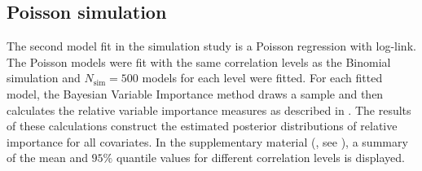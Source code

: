 \subsection{Poisson simulation}
The second model fit in the simulation study is a Poisson regression with log-link. The Poisson models were fit with the same correlation levels as the Binomial simulation and $N_{\text{sim}}=500$ models for each level were fitted. For each fitted model, the Bayesian Variable Importance method draws a sample and then calculates the relative variable importance measures as described in . The results of these calculations construct the estimated posterior distributions of relative importance for all covariates. In the supplementary material (, see ), a summary of the mean and $95\%$ quantile values for different correlation levels is displayed.
